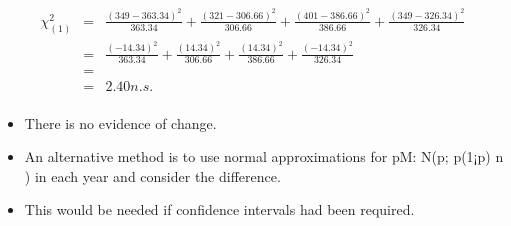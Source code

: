 \documentclass[a4paper,12pt]{article}
\begin{document}
\begin{enumerate}
\begin{eqnarray*}
\chi^2_{
(1)} &=& 
\frac{(349 - 363.34)^2}{
363.34} 
+ \frac{(321 - 306.66)^2}{
306.66} 
+   \frac{(401 - 386.66)^2}{
386.66} 
+ \frac{(349 - 
326.34)^2}{
326.34}\\
&=&  \frac{(-14.34)^2}{363.34} + \frac{(14.34)^2}{306.66} + \frac{(14.34)^2}{386.66} + \frac{(-14.34)^2}{326.34}  \\
&=&  \\
&=& 2.40n.s.\\
\end{eqnarray*}
\begin{itemize}
    \item There is no evidence of change.
\item An alternative method is to use normal approximations for pM: N(p; p(1¡p)
n )
in each year and consider the difference. 
\item This would be needed if confidence
intervals had been required. 
\end{itemize}

\end{enumerate}
\end{document}
